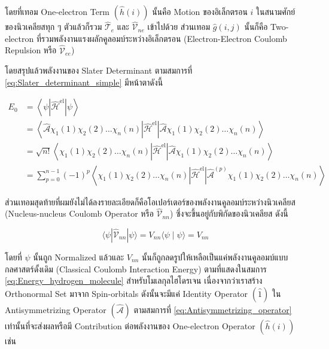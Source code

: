 \noindent โดยที่เทอม One-electron Term $(\hat{h}(i))$ นั้นคือ Motion ของอิเล็กตรอน $i$ ในสนามศักย์ของนิวเคลียสทุก ๆ
ตัวแล้วก็รวม $\hat{\mathscr{T}}_e$ และ $\hat{\mathscr{V}}_{n e}$ เข้าไปด้วย ส่วนเทอม $\hat{g}(i, j)$ นั้นก็คือ Two-electron
ที่รวมพลังงานแรงผลักคูลอมบ์ระหว่างอิเล็กตรอน (Electron-Electron Coulomb Repulsion หรือ $\hat{\mathscr{V}}_{e e}$)

โดยสรุปแล้วพลังงานของ Slater Determinant ตามสมการที่ \eqref{eq:Slater_determinant_simple} มีหน้าตาดังนี้

\begin{equation}
    \label{eq:energy_Slater_determinant}
    \begin{aligned}
        E_0
         & = \left\langle\psi
        \left|\hat{\mathscr{H}}^{\mathrm{el}}\right| \psi\right\rangle             \\
         & = \left\langle\hat{\mathscr{A}} \chi_1(1) \chi_2(2) \dots \chi_n(n)
        \left|\hat{\mathscr{H}}^{\mathrm{el}}\right|
        \hat{\mathscr{A}} \chi_1(1) \chi_2(2) \dots \chi_n(n)\right\rangle         \\
         & = \sqrt{n !}\left\langle\chi_1(1) \chi_2(2) \dots \chi_n(n)
        \left|\hat{\mathscr{H}}^{\mathrm{el}}\right|
        \hat{\mathscr{A}} \chi_1(1) \chi_2(2) \dots \chi_n(n)\right\rangle         \\
         & = \sum_{p=0}^{n-1}(-1)^p\left\langle\chi_1(1) \chi_2(2) \dots \chi_n(n)
        \left|\hat{\mathscr{H}}^{\mathrm{el}}\right|
        \hat{\mathscr{A}}^{(p)} \chi_1(1) \chi_2(2) \dots \chi_n(n)\right\rangle
    \end{aligned}
\end{equation}

ส่วนเทอมสุดท้ายที่ผมยังไม่ได้ลงรายละเอียดก็คือโอเปอร์เตอร์ของพลังงานคูลอมบ์ระหว่างนิวเคลียส (Nucleus-nucleus Coulomb Operator หรือ
$\hat{\mathscr{V}}_{n n}$) ซึ่งจะขึ้นอยู่กับพิกัดของนิวเคลียส ดังนี้

\begin{equation}
    \langle\psi|\hat{\mathscr{V}}_{n n}| \psi\rangle
    = V_{n n}\langle\psi \mid \psi\rangle
    = V_{n n}
\end{equation}

\noindent โดยที่ $\psi$ นั้นถูก Normalized แล้วและ $V_{n n}$ นั้นก็ถูกลดรูปให้เหลือเป็นแค่พลังงานคูลอมบ์แบบกลศาสตร์ดั้งเดิม
(Classical Coulomb Interaction Energy) ตามที่แสดงในสมการ \eqref{eq:Energy_hydrogen_molecule} สำหรับโมเลกุลไฮโดรเจน
เนื่องจากว่าเราสร้าง Orthonormal Set มาจาก Spin-orbitals ดังนั้นจะมีแค่ Identity Operator $(\hat{1})$ ใน Antisymmetrizing
Operator $(\hat{\mathscr{A}})$ ตามสมการที่ \eqref{eq:Antisymmetrizing_operator} เท่านั้นที่จะส่งผลหรือมี Contribution
ต่อพลังงานของ One-electron Operator $(\hat{h}(i))$ เช่น

